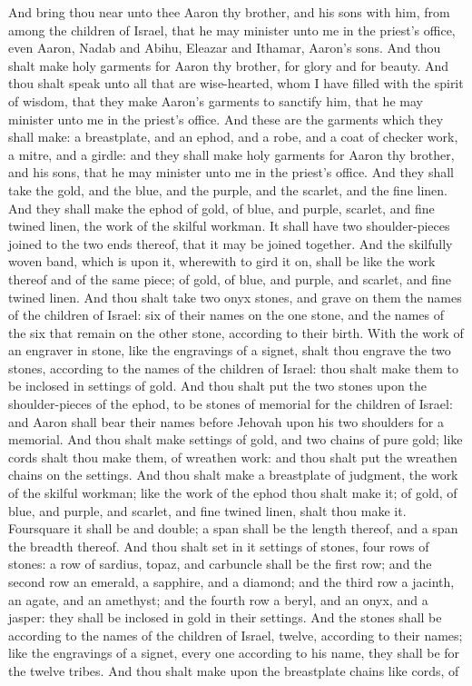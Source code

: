And bring thou near unto thee Aaron thy brother, and his sons with him, from among the children of Israel, that he may minister unto me in the priest’s office, even Aaron, Nadab and Abihu, Eleazar and Ithamar, Aaron’s sons. And thou shalt make holy garments for Aaron thy brother, for glory and for beauty. And thou shalt speak unto all that are wise-hearted, whom I have filled with the spirit of wisdom, that they make Aaron’s garments to sanctify him, that he may minister unto me in the priest’s office. And these are the garments which they shall make: a breastplate, and an ephod, and a robe, and a coat of checker work, a mitre, and a girdle: and they shall make holy garments for Aaron thy brother, and his sons, that he may minister unto me in the priest’s office. And they shall take the gold, and the blue, and the purple, and the scarlet, and the fine linen.  And they shall make the ephod of gold, of blue, and purple, scarlet, and fine twined linen, the work of the skilful workman. It shall have two shoulder-pieces joined to the two ends thereof, that it may be joined together. And the skilfully woven band, which is upon it, wherewith to gird it on, shall be like the work thereof and of the same piece; of gold, of blue, and purple, and scarlet, and fine twined linen. And thou shalt take two onyx stones, and grave on them the names of the children of Israel: six of their names on the one stone, and the names of the six that remain on the other stone, according to their birth. With the work of an engraver in stone, like the engravings of a signet, shalt thou engrave the two stones, according to the names of the children of Israel: thou shalt make them to be inclosed in settings of gold. And thou shalt put the two stones upon the shoulder-pieces of the ephod, to be stones of memorial for the children of Israel: and Aaron shall bear their names before Jehovah upon his two shoulders for a memorial. And thou shalt make settings of gold, and two chains of pure gold; like cords shalt thou make them, of wreathen work: and thou shalt put the wreathen chains on the settings.  And thou shalt make a breastplate of judgment, the work of the skilful workman; like the work of the ephod thou shalt make it; of gold, of blue, and purple, and scarlet, and fine twined linen, shalt thou make it. Foursquare it shall be and double; a span shall be the length thereof, and a span the breadth thereof. And thou shalt set in it settings of stones, four rows of stones: a row of sardius, topaz, and carbuncle shall be the first row; and the second row an emerald, a sapphire, and a diamond; and the third row a jacinth, an agate, and an amethyst; and the fourth row a beryl, and an onyx, and a jasper: they shall be inclosed in gold in their settings. And the stones shall be according to the names of the children of Israel, twelve, according to their names; like the engravings of a signet, every one according to his name, they shall be for the twelve tribes. And thou shalt make upon the breastplate chains like cords, of 